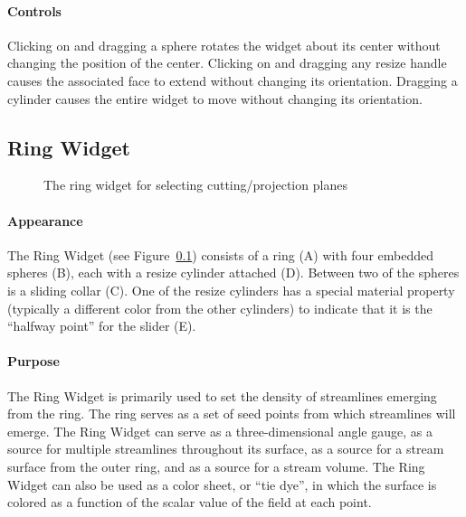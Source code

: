 \paragraph{Controls} Clicking on and dragging a sphere rotates
the widget about its center without changing the position of the center.
Clicking on and dragging any resize handle
causes the associated face to extend without changing its orientation.
Dragging a cylinder causes the entire widget to move without changing its
orientation.

\subsection{Ring Widget}
\label{sec:view-ringwidget} 

\begin{figure}[htb]
  \begin{makeimage}
  \end{makeimage}
  \ringwidget
  \caption{\label{fig:ringwidget} The ring widget for selecting
    cutting/projection planes}
\end{figure}


\paragraph{Appearance} The Ring
Widget (see Figure~\ref{sec:view-ringwidget}) consists of a ring (A)
with four embedded spheres (B), each with a resize cylinder
attached (D).  Between two of the spheres is a sliding collar (C).
One of the resize cylinders has a special material property (typically
a different color from the other cylinders) to indicate that it is the
``halfway point'' for the slider (E).

\paragraph{Purpose} The Ring Widget is primarily used to set the
density of streamlines emerging from the ring. The ring serves as a set of
seed points from which streamlines will emerge. The Ring Widget can 
serve as a three-dimensional angle gauge, as a source for multiple
streamlines throughout its surface, as a source for a stream surface from
the outer ring, and as a source for a stream volume.  The Ring Widget can 
also be used as a color sheet, or ``tie dye'', in which the surface is colored as 
a function of the scalar value of the field at each point.

